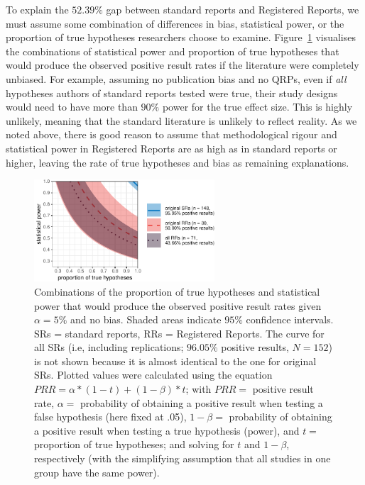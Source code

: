 \documentclass[british,,jou,floatsintext]{apa6}
\begin{document}
To explain the \(52.39 \%\) gap between standard reports and Registered Reports, we must assume some combination of differences in bias, statistical power, or the proportion of true hypotheses researchers choose to examine.
Figure~\ref{fig:powerbaserate} visualises the combinations of statistical power and proportion of true hypotheses that would produce the observed positive result rates if the literature were completely unbiased.
For example, assuming no publication bias and no QRPs, even if \emph{all} hypotheses authors of standard reports tested were true, their study designs would need to have more than \(90\%\) power for the true effect size.
This is highly unlikely, meaning that the standard literature is unlikely to reflect reality.
As we noted above, there is good reason to assume that methodological rigour and statistical power in Registered Reports are as high as in standard reports or higher, leaving the rate of true hypotheses and bias as remaining explanations.



\begin{figure}

{\centering \includegraphics[width=0.6\textwidth]{positive_results_SRs_RRs_files/figure-latex/powerbaserate-1} 

}

\caption{Combinations of the proportion of true hypotheses and statistical power that would produce the observed positive result rates given \(\alpha = 5 \%\) and no bias. Shaded areas indicate \(95\%\) confidence intervals. SRs = standard reports, RRs = Registered Reports. The curve for all SRs (i.e, including replications; \(96.05 \%\) positive results, \(N = 152\)) is not shown because it is almost identical to the one for original SRs. Plotted values were calculated using the equation \(PRR = \alpha*(1-t) + (1-\beta)*t\); with \(PRR =\) positive result rate, \(\alpha =\) probability of obtaining a positive result when testing a false hypothesis (here fixed at .05), \(1-\beta =\) probability of obtaining a positive result when testing a true hypothesis (power), and \(t =\) proportion of true hypotheses; and solving for \(t\) and \(1-\beta\), respectively (with the simplifying assumption that all studies in one group have the same power).}\label{fig:powerbaserate}
\end{figure}
\end{document}
